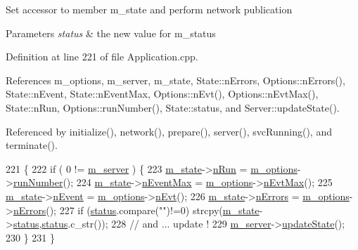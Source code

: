 Set accessor to member m\+\_\+state and perform network publication 
\begin{DoxyParams}{Parameters}
{\em status} & the new value for m\+\_\+status \\
\hline
\end{DoxyParams}


Definition at line 221 of file Application.\+cpp.



References m\+\_\+options, m\+\_\+server, m\+\_\+state, State\+::n\+Errors, Options\+::n\+Errors(), State\+::n\+Event, State\+::n\+Event\+Max, Options\+::n\+Evt(), Options\+::n\+Evt\+Max(), State\+::n\+Run, Options\+::run\+Number(), State\+::status, and Server\+::update\+State().



Referenced by initialize(), network(), prepare(), server(), svc\+Running(), and terminate().


\begin{DoxyCode}
221                                             \{
222   \textcolor{keywordflow}{if} ( 0 != \hyperlink{classApplication_a5e6085b0f322d5036177b16113a75b56}{m\_server} ) \{
223     \hyperlink{classApplication_a0ef9832e2d286716e597a1ff21ffcab4}{m\_state}->\hyperlink{classState_aa29a124a8d6060a02bd2468480d7bbd3}{nRun}      = \hyperlink{classApplication_a3b0c74bf1ba99a5042990e3fefaa8963}{m\_options}->\hyperlink{classOptions_a2d9447919fe90f9ce8df5530526cbb27}{runNumber}();
224     \hyperlink{classApplication_a0ef9832e2d286716e597a1ff21ffcab4}{m\_state}->\hyperlink{classState_ac57f536cfe9e9819dfc891ed00dabfe3}{nEventMax} = \hyperlink{classApplication_a3b0c74bf1ba99a5042990e3fefaa8963}{m\_options}->\hyperlink{classOptions_ad1f3b03d734c806a2feca418b26bcc9b}{nEvtMax}();
225     \hyperlink{classApplication_a0ef9832e2d286716e597a1ff21ffcab4}{m\_state}->\hyperlink{classState_af9d335bba28d6946043a07b047556690}{nEvent}    = \hyperlink{classApplication_a3b0c74bf1ba99a5042990e3fefaa8963}{m\_options}->\hyperlink{classOptions_ad769b256263a4ac24dd6f989ae724ab7}{nEvt}();
226     \hyperlink{classApplication_a0ef9832e2d286716e597a1ff21ffcab4}{m\_state}->\hyperlink{classState_a0dc7f2525107b9b294f50c23da27cc2a}{nErrors}   = \hyperlink{classApplication_a3b0c74bf1ba99a5042990e3fefaa8963}{m\_options}->\hyperlink{classOptions_acc6474323f0bbe17fa844e9a086b90b8}{nErrors}();
227     \textcolor{keywordflow}{if} (\hyperlink{classApplication_ad429c4d2322f706e3564c1ee05d38ff1}{status}.compare(\textcolor{stringliteral}{""})!=0) strcpy(\hyperlink{classApplication_a0ef9832e2d286716e597a1ff21ffcab4}{m\_state}->\hyperlink{classState_aaec062c78d5602d066a7960a2e08e1cd}{status},\hyperlink{classApplication_ad429c4d2322f706e3564c1ee05d38ff1}{status}.c\_str());
228     \textcolor{comment}{// and ... update !}
229     \hyperlink{classApplication_a5e6085b0f322d5036177b16113a75b56}{m\_server}->\hyperlink{classServer_abaa0b878f4f96454339f1989ec12cc6b}{updateState}();
230   \}
231 \}
\end{DoxyCode}
\mbox{\label{classApplication_a48ecc3d76b3f2390ae1ba76d13f8bd54}} 
